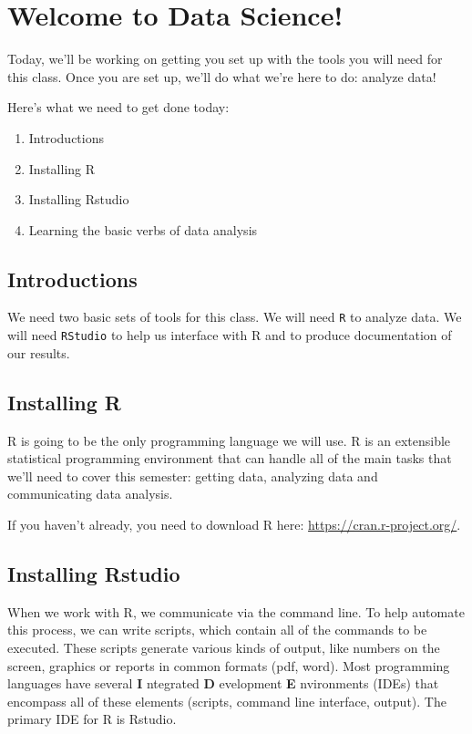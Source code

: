 \documentclass[
]{article}
\author{}
\date{\vspace{-2.5em}}
\providecommand{\tightlist}{%
  \setlength{\itemsep}{0pt}\setlength{\parskip}{0pt}}
\begin{document}
\hypertarget{intro}{%
\section{Welcome to Data Science!}\label{intro}}

Today, we'll be working on getting you set up with the tools you will
need for this class. Once you are set up, we'll do what we're here to
do: analyze data!

Here's what we need to get done today:

\begin{enumerate}
\def\labelenumi{\arabic{enumi}.}
\tightlist
\item
  Introductions\\
\item
  Installing R
\item
  Installing Rstudio
\item
  Learning the basic verbs of data analysis
\end{enumerate}

\hypertarget{introductions}{%
\subsection{Introductions}\label{introductions}}

We need two basic sets of tools for this class. We will need \texttt{R}
to analyze data. We will need \texttt{RStudio} to help us interface with
R and to produce documentation of our results.

\hypertarget{installing-r}{%
\subsection{Installing R}\label{installing-r}}

R is going to be the only programming language we will use. R is an
extensible statistical programming environment that can handle all of
the main tasks that we'll need to cover this semester: getting data,
analyzing data and communicating data analysis.

If you haven't already, you need to download R here:
\url{https://cran.r-project.org/}.

\hypertarget{installing-rstudio}{%
\subsection{Installing Rstudio}\label{installing-rstudio}}

When we work with R, we communicate via the command line. To help
automate this process, we can write scripts, which contain all of the
commands to be executed. These scripts generate various kinds of output,
like numbers on the screen, graphics or reports in common formats (pdf,
word). Most programming languages have several \textbf{I} ntegrated
\textbf{D} evelopment \textbf{E} nvironments (IDEs) that encompass all
of these elements (scripts, command line interface, output). The primary
IDE for R is Rstudio.
\end{document}
